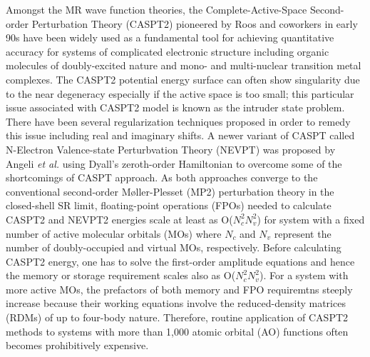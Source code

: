 \documentclass[aip,jcp,amsmath,twocolumn,floatfix,reprint,fleqn]{revtex4-1}
\begin{document}
%
%
%
Amongst the MR wave function theories, the Complete-Active-Space Second-order Perturbation Theory (CASPT2) pioneered by Roos and coworkers\cite{doi:10.1021/j100377a012,doi:10.1063/1.462209} in early 90s have been widely used as a fundamental tool for achieving quantitative accuracy for systems of complicated electronic structure including organic molecules of doubly-excited nature\cite{doi:10.1063/1.2889385} and mono-\cite{doi:10.1021/ct900567c,doi:10.1021/acs.jctc.9b00166} and multi-nuclear\cite{Cramer2008,doi:10.1002/chem.201902766} transition metal complexes.
%
The CASPT2 potential energy surface can often show singularity due to the near degeneracy especially if the active space is too small; this particular issue associated with CASPT2 model is known as the intruder state problem.
%
There have been several regularization techniques proposed in order to remedy this issue including real\cite{ROOS1995215} and imaginary\cite{FORSBERG1997196} shifts.
%
A newer variant of CASPT called N-Electron Valence-state Perturbvation Theory (NEVPT) was proposed by Angeli {\it et al.}\cite{angeliintroduction2001,angelin-electron2002,angelinew2006} using Dyall's zeroth-order Hamiltonian\cite{dyallthe1995} to overcome some of the shortcomings of CASPT approach.
%
As both approaches converge to the conventional second-order M\o ller-Plesset (MP2) perturbation theory\cite{MP2} in the closed-shell SR limit, floating-point operations (FPOs) needed to calculate CASPT2 and NEVPT2 energies scale at least as O($N_c^2N_v^2$) for system with a fixed number of active molecular orbitals (MOs) where $N_c$ and $N_v$ represent the number of doubly-occupied and virtual MOs, respectively.
%
Before calculating CASPT2 energy, one has to solve the first-order amplitude equations and hence the memory or storage requirement scales also as O($N_c^2N_v^2$).
%
For a system with more active MOs, the prefactors of both memory and FPO requiremtns steeply increase because their working equations involve the reduced-density matrices (RDMs) of up to four-body nature.
%
Therefore, routine application of CASPT2 methods to systems with more than 1,000 atomic orbital (AO) functions often becomes prohibitively expensive.
\end{document}

